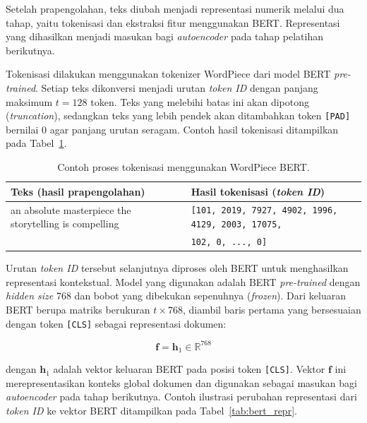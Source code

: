 Setelah prapengolahan, teks diubah menjadi representasi numerik melalui
dua tahap, yaitu tokenisasi dan ekstraksi fitur menggunakan BERT.
Representasi yang dihasilkan menjadi masukan bagi \textit{autoencoder}
pada tahap pelatihan berikutnya.

Tokenisasi dilakukan menggunakan tokenizer WordPiece dari model BERT
\textit{pre-trained}. Setiap teks dikonversi menjadi urutan \textit{token ID}
dengan panjang maksimum $t = 128$ token. Teks yang melebihi batas ini akan
dipotong (\textit{truncation}), sedangkan teks yang lebih pendek akan
ditambahkan token \texttt{[PAD]} bernilai 0 agar panjang urutan seragam.
Contoh hasil tokenisasi ditampilkan pada Tabel~\ref{tab:tokenisasi}.

\begin{table}[H]
    \centering
    \caption{Contoh proses tokenisasi menggunakan WordPiece BERT.}
    \label{tab:tokenisasi}
    \begin{tabular}{p{} p{}}
        \hline
        \textbf{Teks (hasil prapengolahan)} &
        \textbf{Hasil tokenisasi (\textit{token ID})} \\
        \hline
        an absolute masterpiece the storytelling is compelling &
        \texttt{[101, 2019, 7927, 4902, 1996, 4129, 2003, 17075,} \\
        & \texttt{102, 0, ..., 0]} \\
        \hline
    \end{tabular}
\end{table}

Urutan \textit{token ID} tersebut selanjutnya diproses oleh BERT untuk
menghasilkan representasi kontekstual. Model yang digunakan adalah BERT
\textit{pre-trained} dengan \textit{hidden size} 768 dan bobot yang
dibekukan sepenuhnya (\textit{frozen}). Dari keluaran BERT berupa matriks
berukuran $t \times 768$, diambil baris pertama yang bersesuaian dengan
token \texttt{[CLS]} sebagai representasi dokumen:

\begin{equation}
    \mathbf{f} = \mathbf{h}_1 \in \mathbb{R}^{768}
\end{equation}

\noindent dengan $\mathbf{h}_1$ adalah vektor keluaran BERT pada posisi
token \texttt{[CLS]}. Vektor $\mathbf{f}$ ini merepresentasikan konteks
global dokumen dan digunakan sebagai masukan bagi \textit{autoencoder}
pada tahap berikutnya. Contoh ilustrasi perubahan representasi dari
\textit{token ID} ke vektor BERT ditampilkan pada
Tabel~\ref{tab:bert_repr}.

